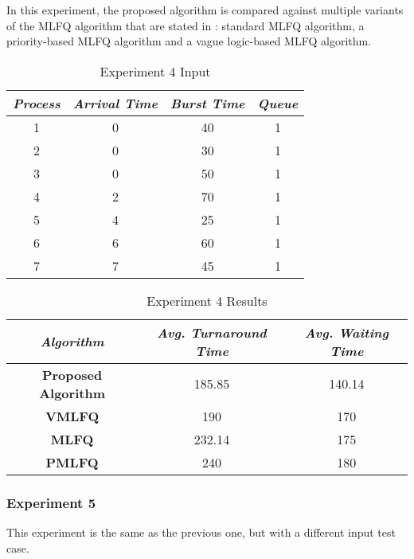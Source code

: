 \documentclass[conference]{IEEEtran}
\newcommand\T{\rule{0pt}{2.6ex}}       %
\newcommand\B{\rule[-1.2ex]{0pt}{0pt}} %
\begin{document}
In this experiment, the proposed algorithm is compared against multiple variants of the MLFQ algorithm that are stated in \cite{b6}: standard MLFQ algorithm, a priority-based MLFQ algorithm and a vague logic-based MLFQ algorithm.

\begin{table}[H]
    \caption{Experiment 4 Input}
    \centering
     \begin{tabular}{||c c c c||} 
     \hline
     \textit{\textbf{Process}} & \textit{\textbf{Arrival Time}} & \textit{\textbf{Burst Time}} & \textit{\textbf{Queue}} \T \B \\ 
     \hline
     \hline
     1 & 0 & 40 & 1 \T \B \\ 
     \hline
     2 & 0 & 30 & 1 \T \B \\
     \hline
     3 & 0 & 50 & 1 \T \B \\
     \hline
     4 & 2 & 70 & 1 \T \B \\
     \hline
     5 & 4 & 25 & 1 \T \B \\ 
     \hline
     6 & 6 & 60 & 1 \T \B \\ 
     \hline
     7 & 7 & 45 & 1 \T \B \\ 
     \hline
     \end{tabular}
\end{table}

\begin{table}[H]
    \caption{Experiment 4 Results}
    \centering
    \begin{tabular}{||c c c||}
        \hline
        \textit{\textbf{Algorithm}} & \textit{\textbf{Avg. Turnaround Time}} & \textit{\textbf{Avg. Waiting Time}}\T \B \\
    \hline
    \hline
    \textbf{Proposed Algorithm} & 185.85 & 140.14 \T \B\\ \hline
    \textbf{VMLFQ} & 190 & 170 \T \B\\ \hline
    \textbf{MLFQ} & 232.14 & 175 \T \B\\ \hline
    \textbf{PMLFQ} & 240 & 180 \T \B\\ \hline
     \end{tabular}
\end{table}

\subsubsection{Experiment 5}

This experiment is the same as the previous one, but with a different input test case. 
\end{document}
